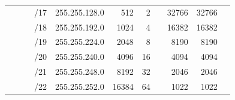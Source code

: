 \documentclass[11pt,a4paper]{article}
\begin{document}
\begin{table}[p!]
\begin{tabular}{ccccl|r|r|r|r|r|r|}
\multicolumn{1}{c|}{}                                  & \multicolumn{1}{c|}{}                                  & \multicolumn{1}{c|}{}                                  & \multicolumn{1}{c|}{/17} & 255.255.128.0                & 512                          & 2                            &                              & 32766                        & 32766                        &                              \\ \cline{4-11} 
\multicolumn{1}{c|}{}                                  & \multicolumn{1}{c|}{}                                  & \multicolumn{1}{c|}{}                                  & \multicolumn{1}{c|}{/18} & 255.255.192.0                & 1024                         & 4                            &                              & 16382                        & 16382                        &                              \\ \cline{4-11} 
\multicolumn{1}{c|}{}                                  & \multicolumn{1}{c|}{}                                  & \multicolumn{1}{c|}{}                                  & \multicolumn{1}{c|}{/19} & 255.255.224.0                & 2048                         & 8                            &                              & 8190                         & 8190                         &                              \\ \cline{4-11} 
\multicolumn{1}{c|}{}                                  & \multicolumn{1}{c|}{}                                  & \multicolumn{1}{c|}{}                                  & \multicolumn{1}{c|}{/20} & 255.255.240.0                & 4096                         & 16                           &                              & 4094                         & 4094                         &                              \\ \cline{4-11} 
\multicolumn{1}{c|}{}                                  & \multicolumn{1}{c|}{}                                  & \multicolumn{1}{c|}{}                                  & \multicolumn{1}{c|}{/21} & 255.255.248.0                & 8192                         & 32                           &                              & 2046                         & 2046                         &                              \\ \cline{4-11} 
\multicolumn{1}{c|}{}                                  & \multicolumn{1}{c|}{}                                  & \multicolumn{1}{c|}{}                                  & \multicolumn{1}{c|}{/22} & 255.255.252.0                & 16384                        & 64                           &                              & 1022                         & 1022                         &                              \\ \cline{4-11} 

\end{tabular}
\end{table}
\end{document}
